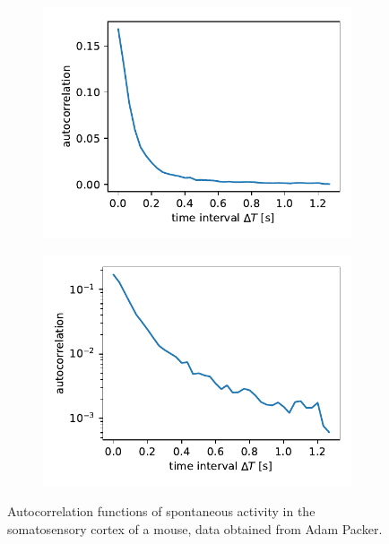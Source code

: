 \documentclass[12pt,a4paper,headinclude]{scrartcl}
\begin{document}
\begin{figure}
	\begin{subfigure}{.5\textwidth}
		\centering
		\includegraphics[width=1\linewidth]{./figures/packer_example_lin.pdf}
	\end{subfigure}%
	\begin{subfigure}{.5\textwidth}
		\centering
		\includegraphics[width=1\linewidth]{./figures/packer_example_log.pdf}
	\end{subfigure}%
	
	\caption{Autocorrelation functions of spontaneous activity in the somatosensory cortex of a mouse, data obtained from Adam Packer.}
	\label{fig:packer_example}
\end{figure} 
\end{document}
